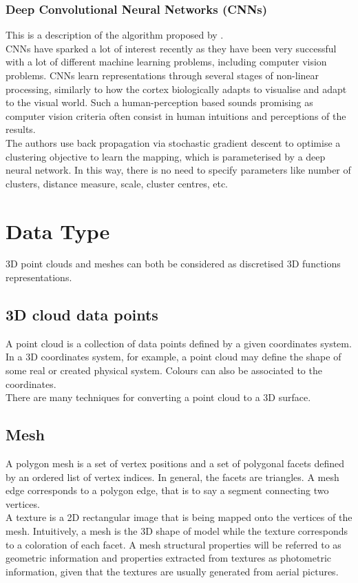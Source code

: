 \documentclass{kththesis}
\begin{document}
\subsubsection{Deep Convolutional Neural Networks (CNNs) }
This is a description of the algorithm proposed by \textcite{ClusteringTechniques}. \\
CNNs have sparked a lot of interest recently as they have been very successful with a lot of different machine learning problems, including computer vision problems. CNNs learn representations through several stages of non-linear processing, similarly to how the cortex biologically adapts to visualise and adapt to the visual world. Such a human-perception based sounds promising as computer vision criteria often consist in human intuitions and perceptions of the results. \\
The authors use back propagation via stochastic
gradient descent to optimise a clustering objective to learn the mapping, which is parameterised by
a deep neural network. In this way, there is no need to specify parameters like number of clusters,
distance measure, scale, cluster centres, etc.




\section{Data Type}
3D point clouds and meshes can both be considered as discretised 3D functions representations. 
\subsection{3D cloud data points}
A point cloud is a collection of data points defined by a given coordinates system. In a 3D coordinates system, for example, a point cloud may define the shape of some real or created physical system. Colours can also be associated to the coordinates. \\
There are many techniques for converting a point cloud to a 3D surface.
\subsection{Mesh}
A polygon mesh is a set of vertex positions and a set of polygonal facets defined by an ordered list of vertex indices. In general, the facets are triangles. A mesh edge corresponds to a polygon edge, that is to say a segment connecting two vertices.\\
A texture is a 2D rectangular image that is being mapped onto the vertices of the mesh. Intuitively, a mesh is the 3D shape of model while the texture corresponds to a coloration of each facet. A mesh structural properties will be referred to as geometric information and properties extracted from textures as photometric information, given that the textures are usually generated from aerial pictures. 
\end{document}
